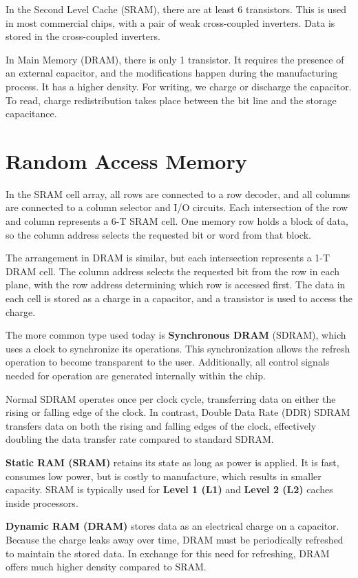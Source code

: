 In the Second Level Cache (SRAM), there are at least 6 transistors. This is used in most commercial chips, with a pair of weak cross-coupled inverters. Data is stored in the cross-coupled inverters.

In Main Memory (DRAM), there is only 1 transistor. It requires the presence of an external capacitor, and the modifications happen during the manufacturing process. It has a higher density. For writing, we charge or discharge the capacitor. To read, charge redistribution takes place between the bit line and the storage capacitance.

\section{Random Access Memory}
In the SRAM cell array, all rows are connected to a row decoder, and all columns are connected to a column selector and I/O circuits. Each intersection of the row and column represents a 6-T SRAM cell. One memory row holds a block of data, so the column address selects the requested bit or word from that block.

The arrangement in DRAM is similar, but each intersection represents a 1-T DRAM cell. The column address selects the requested bit from the row in each plane, with the row address determining which row is accessed first. The data in each cell is stored as a charge in a capacitor, and a transistor is used to access the charge.

The more common type used today is \textbf{Synchronous DRAM} (SDRAM), which uses a clock to synchronize its operations. This synchronization allows the refresh operation to become transparent to the user. Additionally, all control signals needed for operation are generated internally within the chip.

Normal SDRAM operates once per clock cycle, transferring data on either the rising or falling edge of the clock. In contrast, Double Data Rate (DDR) SDRAM transfers data on both the rising and falling edges of the clock, effectively doubling the data transfer rate compared to standard SDRAM.

\textbf{Static RAM (SRAM)} retains its state as long as power is applied. It is fast, consumes low power, but is costly to manufacture, which results in smaller capacity. SRAM is typically used for \textbf{Level 1 (L1)} and \textbf{Level 2 (L2)} caches inside processors.

\textbf{Dynamic RAM (DRAM)} stores data as an electrical charge on a capacitor. Because the charge leaks away over time, DRAM must be periodically refreshed to maintain the stored data. In exchange for this need for refreshing, DRAM offers much higher density compared to SRAM.

